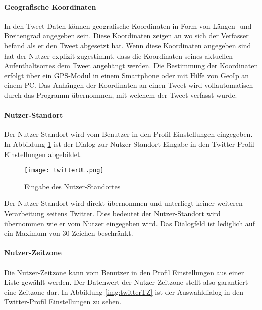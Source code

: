 			\paragraph{Geografische Koordinaten}
				
				In den Tweet-Daten können geografische Koordinaten in Form von Längen- und Breitengrad angegeben sein. 
				Diese Koordinaten zeigen an wo sich der Verfasser befand als er den Tweet abgesetzt hat.
				Wenn diese Koordinaten angegeben sind hat der Nutzer explizit zugestimmt, dass die Koordinaten seines aktuellen Aufenthaltsortes dem Tweet angehängt werden. 
				Die Bestimmung der Koordinaten erfolgt über ein GPS-Modul in einem Smartphone oder mit Hilfe von GeoIp an einem PC.
				Das Anhängen der Koordinaten an einen Tweet wird vollautomatisch durch das Programm übernommen, mit welchem der Tweet verfasst wurde.

			\paragraph{Nutzer-Standort} 
				
				Der Nutzer-Standort wird vom Benutzer in den Profil Einstellungen eingegeben.
				In Abbildung \ref{img:twitterLocation} ist der Dialog zur Nutzer-Standort Eingabe in den Twitter-Profil Einstellungen abgebildet.


				\begin{figure}[!ht]
						\begin{center}
							\texttt{[image: twitterUL.png]}
							\caption{Eingabe des Nutzer-Standortes}
							\label{img:twitterLocation}
						\end{center}
					\end{figure}	

				Der Nutzer-Standort wird direkt übernommen und unterliegt keiner weiteren Verarbeitung seitens Twitter.
				Dies bedeutet der Nutzer-Standort wird übernommen wie er vom Nutzer eingegeben wird.
				Das Dialogfeld ist lediglich auf ein Maximum von 30 Zeichen beschränkt. 

			\paragraph{Nutzer-Zeitzone} 

				Die Nutzer-Zeitzone kann vom Benutzer in den Profil Einstellungen aus einer Liste gewählt werden.
				Der Datenwert der Nutzer-Zeitzone stellt also garantiert eine Zeitzone dar. 
				In Abbildung \ref{img:twitterTZ} ist der Auswahldialog in den Twitter-Profil Einstellungen zu sehen.

